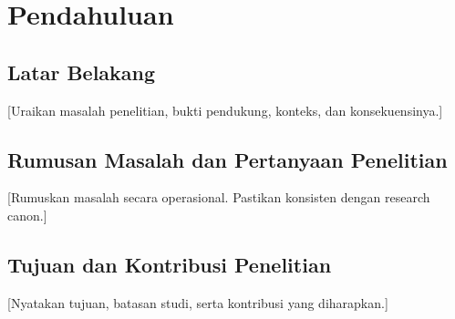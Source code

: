 \chapter{Pendahuluan}
\section{Latar Belakang}
[Uraikan masalah penelitian, bukti pendukung, konteks, dan konsekuensinya.]

\section{Rumusan Masalah dan Pertanyaan Penelitian}
[Rumuskan masalah secara operasional. Pastikan konsisten dengan research canon.]

\section{Tujuan dan Kontribusi Penelitian}
[Nyatakan tujuan, batasan studi, serta kontribusi yang diharapkan.]
